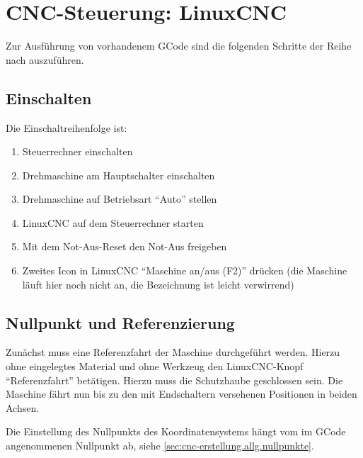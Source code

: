\documentclass{\basedir/fablab-document}
\begin{document}
\section{CNC-Steuerung: LinuxCNC}

Zur Ausführung von vorhandenem GCode sind die folgenden Schritte der Reihe nach auszuführen.

\subsection{Einschalten}
Die Einschaltreihenfolge ist:
\begin{enumerate}
	\item Steuerrechner einschalten
	\item Drehmaschine am Hauptschalter einschalten
	\item Drehmaschine auf Betriebsart \enquote{Auto} stellen
	\item LinuxCNC auf dem Steuerrechner starten
	\item Mit dem Not-Aus-Reset den Not-Aus freigeben
	\item Zweites Icon in LinuxCNC "`Maschine an/aus (F2)"' drücken (die Maschine läuft hier noch nicht an, die Bezeichnung ist leicht verwirrend)
\end{enumerate}

\subsection{Nullpunkt und Referenzierung}

Zunächst muss eine Referenzfahrt der Maschine durchgeführt werden. Hierzu ohne eingelegtes Material und ohne Werkzeug den LinuxCNC-Knopf \enquote{Referenzfahrt} betätigen. Hierzu muss die Schutzhaube geschlossen sein. Die Maschine fährt nun bis zu den mit Endschaltern versehenen Positionen in beiden Achsen.

Die Einstellung des Nullpunkts des Koordinatensystems hängt vom im GCode angenommenen Nullpunkt ab, siehe \ref{sec:cnc-erstellung.allg.nullpunkte}.
\end{document}
